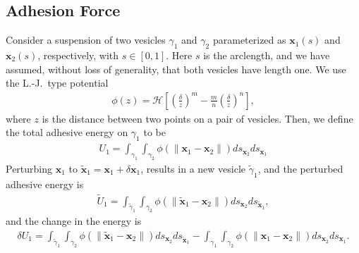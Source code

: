 \documentclass[prf,superscriptaddress,showkeys]{revtex4-1}
\newcommand{\xx}{\mathbf{x}}
\begin{document}
\begin{appendices}
\section{Adhesion Force}
\label{sec:appendixA}
Consider a suspension of two vesicles $\gamma_1$ and $\gamma_2$
parameterized as $\xx_1(s)$ and $\xx_2(s)$, respectively, with $s \in
[0,1]$.  Here $s$ is the arclength, and we have assumed, without loss of
generality, that both vesicles have length one.  We use the  L.-J.~type
potential
\begin{align*}
  \phi(z) = \mathcal{H} \left[ 
    \left(\frac{\delta}{z}\right)^m - \frac{m}{n}\left(\frac{\delta}{z}\right)^n \right],
\end{align*}
where $z$ is the distance between two points on a pair of vesicles.  Then, we define the total
adhesive energy on $\gamma_1$ to be
\begin{align*}
  U_1 = \int_{\gamma_1} \int_{\gamma_2} \phi(\|\xx_1 - \xx_2\|) 
    ds_{\xx_2} ds_{\xx_1}
\end{align*}
Perturbing $\xx_1$ to $\tilde{\xx}_1 = \xx_1 +  \delta \xx_1$, results
in a new vesicle $\tilde{\gamma}_1$, and the perturbed adhesive energy is
\begin{align*}
  \widetilde{U}_1 = \int_{\tilde{\gamma}_1} \int_{\gamma_2}
  \phi(\|\tilde{\xx}_1 - \xx_2\|) ds_{\xx_2} ds_{\tilde{\xx}_1},
\end{align*}
and the change in the energy is
\begin{align*}
  \delta U_1 = \int_{\tilde{\gamma}_1} \int_{\gamma_2}
  \phi(\|\tilde{\xx}_1 - \xx_2\|) ds_{\xx_2} ds_{\tilde{\xx}_1} - 
  \int_{\gamma_1} \int_{\gamma_2} \phi(\|\xx_1 - \xx_2\|) 
  ds_{\xx_2} ds_{\xx_1}.
\end{align*}


\end{appendices}
\end{document}
